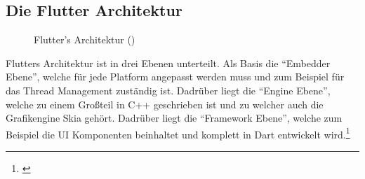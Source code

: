 \subsection{Die Flutter Architektur}\label{anhang:flutterarc}

\begin{figure}[H]
    \centering
    \caption{Flutter's Architektur (\cite{flutterarchitecture})}
\end{figure}

Flutters Architektur ist in drei Ebenen unterteilt. Als Basis die "`Embedder Ebene"', welche für jede Platform angepasst werden muss und zum Beispiel für das Thread Management zuständig ist. Dadrüber liegt die "`Engine Ebene"', welche zu einem Großteil in C++ geschrieben ist und zu welcher auch die Grafikengine Skia gehört. Dadrüber liegt die "`Framework Ebene"', welche zum Beispiel die UI Komponenten beinhaltet und komplett in Dart entwickelt wird.\footnote{\cite{flutterarchitecture}}
